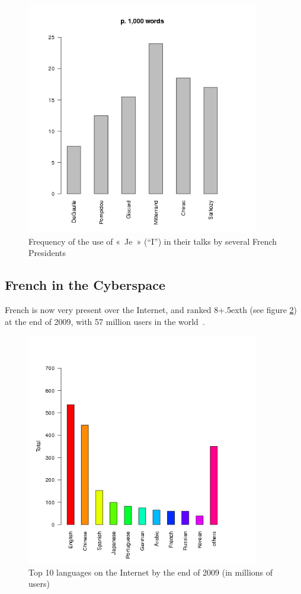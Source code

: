 \begin{multicols}{2}
\begin{figure}[ht]
\begin{center}
 \includegraphics[height=4.0in]{_media/french/je_freq_eng.png} 
  \caption{Frequency of the use of «~Je~» (``I'') in their talks by several French Presidents}
  \label{fig:je_stats_en}
\end{center}
\end{figure}

\subsection{French in the Cyberspace}

French is now very present over the Internet, and ranked
8\raise+.5ex\hbox{th} (see figure \ref{fig:internettop10_en}) at the end
of 2009, with 57 million users in the world~\cite{internettop10}.

\begin{figure}[ht]
\begin{center}
 \includegraphics[height=4.0in]{_media/french/french_pix2_top_10_Internet_languages_2010_english.png}
  \caption{Top 10 languages on the Internet by the end of 2009 (in millions of users)~\cite{internettop10}}
  \label{fig:internettop10_en}
\end{center}
\end{figure}


\end{multicols}
